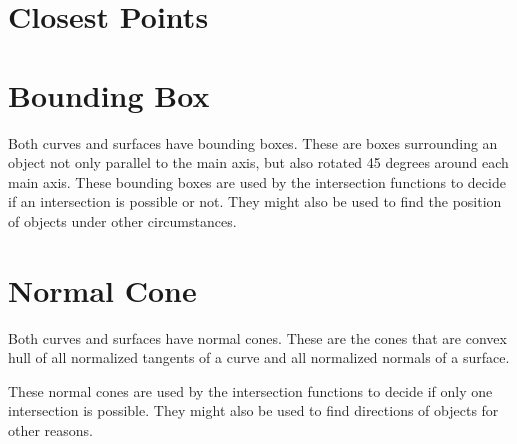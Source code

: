 \section{Closest Points}

\pgsbreak

\pgsbreak

\pgsbreak

\pgsbreak
\section{Bounding Box}
Both curves and surfaces have bounding boxes. These are boxes surrounding an object not only parallel to the main axis, but also rotated 45 degrees around each main axis. These bounding boxes are used by the intersection functions to decide if an intersection is possible or not. They might also be used to find the position of objects under other circumstances.

\pgsbreak

\pgsbreak
\section{Normal Cone}
Both curves and surfaces have normal cones. These are the cones that are convex hull of all normalized tangents of a curve and all normalized normals of a surface.

These normal cones are used by the intersection functions to decide if only one intersection is possible. They might also be used to find directions of objects for other reasons.

\pgsbreak


